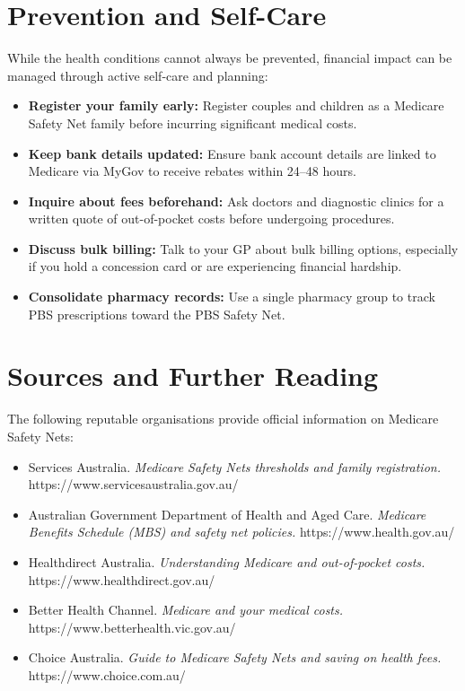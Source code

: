 \section*{Prevention and Self-Care}
While the health conditions cannot always be prevented, financial impact can be managed through active self-care and planning:
\begin{itemize}
    \item \textbf{Register your family early:} Register couples and children as a Medicare Safety Net family before incurring significant medical costs.
    \item \textbf{Keep bank details updated:} Ensure bank account details are linked to Medicare via MyGov to receive rebates within 24--48 hours.
    \item \textbf{Inquire about fees beforehand:} Ask doctors and diagnostic clinics for a written quote of out-of-pocket costs before undergoing procedures.
    \item \textbf{Discuss bulk billing:} Talk to your GP about bulk billing options, especially if you hold a concession card or are experiencing financial hardship.
    \item \textbf{Consolidate pharmacy records:} Use a single pharmacy group to track PBS prescriptions toward the PBS Safety Net.
\end{itemize}

\section*{Sources and Further Reading}
The following reputable organisations provide official information on Medicare Safety Nets:
\begin{itemize}
    \item Services Australia. \textit{Medicare Safety Nets thresholds and family registration.} https://www.servicesaustralia.gov.au/
    \item Australian Government Department of Health and Aged Care. \textit{Medicare Benefits Schedule (MBS) and safety net policies.} https://www.health.gov.au/
    \item Healthdirect Australia. \textit{Understanding Medicare and out-of-pocket costs.} https://www.healthdirect.gov.au/
    \item Better Health Channel. \textit{Medicare and your medical costs.} https://www.betterhealth.vic.gov.au/
    \item Choice Australia. \textit{Guide to Medicare Safety Nets and saving on health fees.} https://www.choice.com.au/
\end{itemize}
